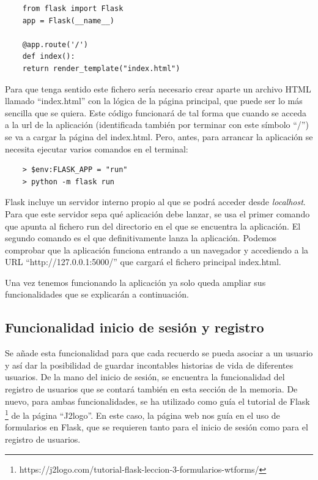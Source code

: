 \begin{verbatim}
	from flask import Flask
	app = Flask(__name__)
	
	@app.route('/')
	def index():
	return render_template("index.html")
\end{verbatim}

Para que tenga sentido este fichero sería necesario crear aparte un archivo HTML llamado ``index.html'' con la lógica de la página principal, que puede ser lo más sencilla que se quiera. Este código funcionará de tal forma que cuando se acceda a la url de la aplicación (identificada también por terminar con este símbolo ``/'') se va a cargar la página del index.html. Pero, antes, para arrancar la aplicación se necesita ejecutar varios comandos en el terminal:

\begin{verbatim}
	> $env:FLASK_APP = "run"
	> python -m flask run
\end{verbatim}

Flask incluye un servidor interno propio al que se podrá acceder desde \textit{localhost}. Para que este servidor sepa qué aplicación debe lanzar, se usa el primer comando que apunta al fichero run del directorio en el que se encuentra la aplicación. El segundo comando es el que definitivamente lanza la aplicación. Podemos comprobar que la aplicación funciona entrando a un navegador y accediendo a la URL ``http://127.0.0.1:5000/'' que cargará el fichero principal index.html. 

Una vez tenemos funcionando la aplicación ya solo queda ampliar sus funcionalidades que se explicarán a continuación. 


\subsection{Funcionalidad inicio de sesión y registro}

Se añade esta funcionalidad para que cada recuerdo se pueda asociar a un usuario y así dar la posibilidad de guardar incontables historias de vida de diferentes usuarios. De la mano del inicio de sesión, se encuentra la funcionalidad del registro de usuarios que se contará también en esta sección de la memoria. De nuevo, para ambas funcionalidades, se ha utilizado como guía el tutorial de Flask \footnote{https://j2logo.com/tutorial-flask-leccion-3-formularios-wtforms/} de la página ``J2logo''. En este caso, la página web nos guía en el uso de formularios en Flask, que se requieren tanto para el inicio de sesión como para el registro de usuarios. 

